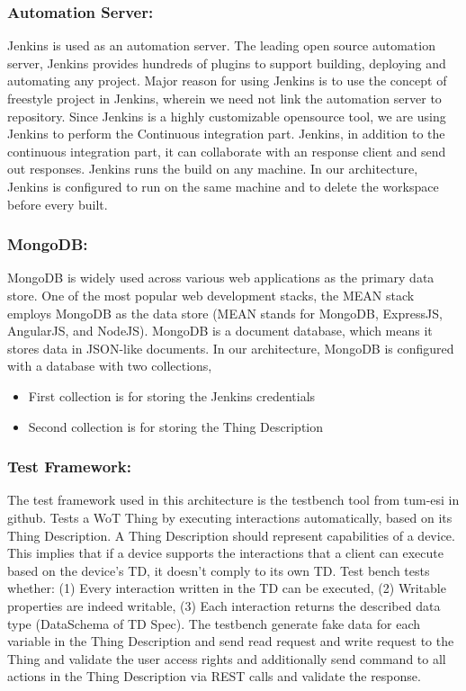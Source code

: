 \documentclass[conference]{IEEEtran}
\theoremstyle{definition}
\begin{document}
\subsubsection{Automation Server:}

Jenkins is used as an automation server. 
The leading open source automation server, Jenkins provides hundreds of plugins to support building, deploying and automating any project. 
Major reason for using Jenkins is to use the concept of freestyle project in Jenkins, wherein we need not link the automation server to repository. 
Since Jenkins is a highly customizable opensource tool, we are using Jenkins to perform the Continuous integration part.  
Jenkins, in addition to the continuous integration part, it can collaborate with an response client and send out responses. 
Jenkins runs the build on any machine. 
In our architecture, Jenkins is configured to run on the same machine and to delete the workspace before every built.

\subsubsection{MongoDB:}

MongoDB is widely used across various web applications as the primary data store. 
One of the most popular web development stacks, the MEAN stack employs MongoDB as the data store (MEAN stands for MongoDB, ExpressJS, AngularJS, and NodeJS). 
MongoDB is a document database, which means it stores data in JSON-like documents. 
In our architecture, MongoDB is configured with a database with two collections, 

\begin{itemize}
  \item First collection is for storing the Jenkins credentials
  \item Second collection is for storing the Thing Description
\end{itemize}

\subsubsection{Test Framework: }

The test framework used in this architecture is the testbench tool from tum-esi in github. 
Tests a WoT Thing by executing interactions automatically, based on its Thing Description. A Thing Description should represent capabilities of a device. This implies that if a device supports the interactions that a client can execute based on the device's TD, it doesn't comply to its own TD. Test bench tests whether: (1) Every interaction written in the TD can be executed, (2) Writable properties are indeed writable, (3) Each interaction returns the described data type (DataSchema of TD Spec). The testbench generate fake data for each variable in the Thing Description and send read request and write request to the Thing and validate the user access rights and additionally send command to all actions in the Thing Description via REST calls and validate the response.
\end{document}

